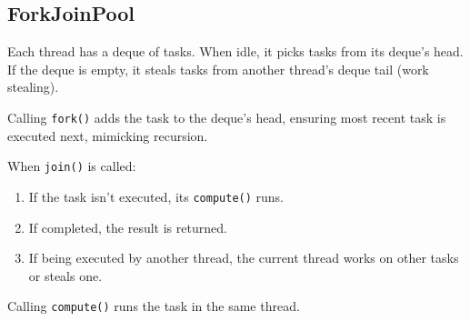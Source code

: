 \documentclass[12pt, a4paper]{article}
\begin{document}
\begin{multicols*}{3}
\subsection{ForkJoinPool}
Each thread has a deque of tasks. When idle, it picks tasks from its deque's head. If the deque is empty, it steals tasks from another thread's deque tail (work stealing).

Calling \lstinline|fork()| adds the task to the deque's head, ensuring most recent task is executed next, mimicking recursion.

When \lstinline|join()| is called:
\begin{enumerate}[\roman*.]
  \item If the task isn't executed, its \lstinline|compute()| runs.
  \item If completed, the result is returned.
  \item If being executed by another thread, the current thread works on other tasks or steals one.
\end{enumerate}

Calling \lstinline|compute()| runs the task in the same thread.
\end{multicols*}
\end{document}
